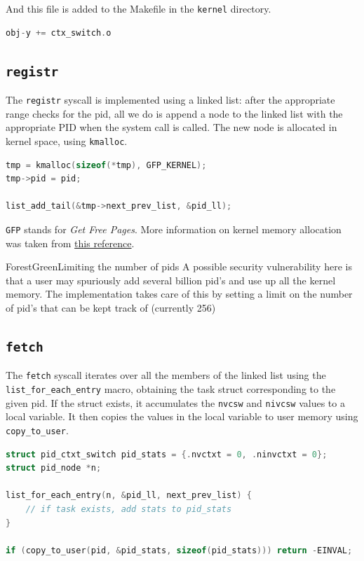 \documentclass[12pt]{article}
\begin{document}
And this file is added to the Makefile in the \texttt{kernel} directory.
\begin{lstlisting}[language=C]
obj-y += ctx_switch.o
\end{lstlisting}

\subsection{\texttt{registr}}

The \texttt{registr} syscall is implemented using a linked list: after the 
appropriate range checks for the pid, all we do is append a node to the linked
list with the appropriate PID when the system call is called. The new node is
allocated in kernel space, using \texttt{kmalloc}.

\begin{lstlisting}[language=C]
tmp = kmalloc(sizeof(*tmp), GFP_KERNEL);
tmp->pid = pid;

list_add_tail(&tmp->next_prev_list, &pid_ll);
\end{lstlisting}
\texttt{GFP} stands for \textit{Get Free Pages}. More information on kernel
memory allocation was taken from 
\href{https://www.kernel.org/doc/html/v5.18/core-api/memory-allocation.html}{this reference}.

\begin{mybox}{ForestGreen}{Limiting the number of pids}
A possible security vulnerability here is that a user may spuriously add several
billion pid's and use up all the kernel memory. The implementation takes care
of this by setting a limit on the number of pid's that can be kept track of 
(currently 256)
\end{mybox}

\subsection{\texttt{fetch}}

The \texttt{fetch} syscall iterates over all the members of the linked list
using the \texttt{list\_for\_each\_entry} macro, obtaining the task struct
corresponding to the given pid. If the struct exists, it accumulates the
\texttt{nvcsw} and \texttt{nivcsw} values to a local variable. It then copies
the values in the local variable to user memory using \texttt{copy\_to\_user}. 

\begin{lstlisting}[language=C]
struct pid_ctxt_switch pid_stats = {.nvctxt = 0, .ninvctxt = 0};
struct pid_node *n;

list_for_each_entry(n, &pid_ll, next_prev_list) {
    // if task exists, add stats to pid_stats
}

if (copy_to_user(pid, &pid_stats, sizeof(pid_stats))) return -EINVAL;
\end{lstlisting}
\end{document}
